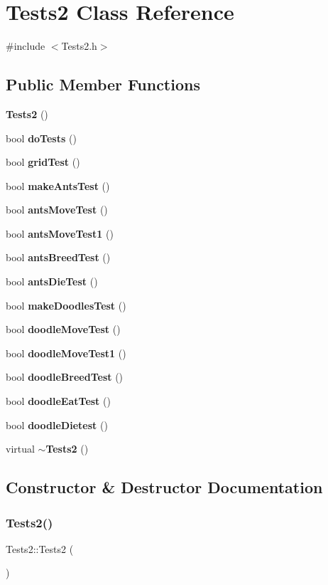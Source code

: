 \section{Tests2 Class Reference}
\label{classTests2}


{\ttfamily \#include $<$Tests2.\+h$>$}

\subsection*{Public Member Functions}
\begin{DoxyCompactItemize}
\item 
\textbf{ Tests2} ()
\item 
bool \textbf{ do\+Tests} ()
\item 
bool \textbf{ grid\+Test} ()
\item 
bool \textbf{ make\+Ants\+Test} ()
\item 
bool \textbf{ ants\+Move\+Test} ()
\item 
bool \textbf{ ants\+Move\+Test1} ()
\item 
bool \textbf{ ants\+Breed\+Test} ()
\item 
bool \textbf{ ants\+Die\+Test} ()
\item 
bool \textbf{ make\+Doodles\+Test} ()
\item 
bool \textbf{ doodle\+Move\+Test} ()
\item 
bool \textbf{ doodle\+Move\+Test1} ()
\item 
bool \textbf{ doodle\+Breed\+Test} ()
\item 
bool \textbf{ doodle\+Eat\+Test} ()
\item 
bool \textbf{ doodle\+Dietest} ()
\item 
virtual \textbf{ $\sim$\+Tests2} ()
\end{DoxyCompactItemize}


\subsection{Constructor \& Destructor Documentation}
\mbox{\label{classTests2_a6d7d8d248dd3d544199769baa1face60}} 
\subsubsection{Tests2()}
{\footnotesize\ttfamily Tests2\+::\+Tests2 (\begin{DoxyParamCaption}{ }\end{DoxyParamCaption})}

